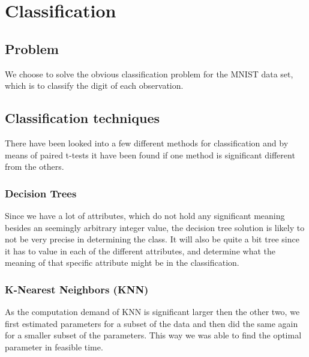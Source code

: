 \chapter{Classification}

\section{Problem}
We choose to solve the obvious classification problem for the MNIST data set, which is to classify the digit of each observation. 

\section{Classification techniques}
There have been looked into a few different methods for classification and by means of paired t-tests it have been found if one method is significant different from the others.

\subsection{Decision Trees}
Since we have a lot of attributes, which do not hold any significant meaning besides an seemingly arbitrary integer value, the decision tree solution is likely to not be very precise in determining the class. It will also be quite a bit tree since it has to value in each  of the different attributes, and determine what the meaning of that specific attribute might be in the classification.


\subsection{K-Nearest Neighbors (KNN)}
As the computation demand of KNN is significant larger then the other two, we first estimated parameters for a subset of the data and then did the same again for a smaller subset of the parameters. This way we was able to find the optimal parameter in feasible time.

